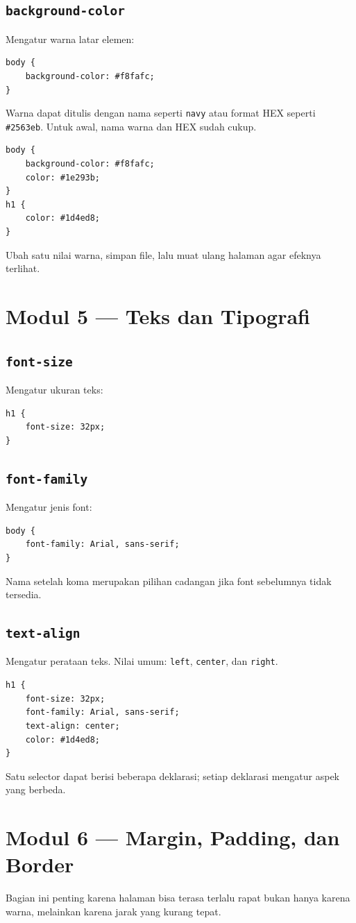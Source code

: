 \documentclass[11pt,a4paper]{article}
\begin{document}
\subsection{\texttt{background-color}}
Mengatur warna latar elemen:
\begin{lstlisting}
body {
    background-color: #f8fafc;
}
\end{lstlisting}
Warna dapat ditulis dengan nama seperti \texttt{navy} atau format HEX seperti \texttt{\#2563eb}. Untuk awal, nama warna dan HEX sudah cukup.
\begin{lstlisting}
body {
    background-color: #f8fafc;
    color: #1e293b;
}
h1 {
    color: #1d4ed8;
}
\end{lstlisting}
Ubah satu nilai warna, simpan file, lalu muat ulang halaman agar efeknya terlihat.

\section{Modul 5 --- Teks dan Tipografi}
\subsection{\texttt{font-size}}
Mengatur ukuran teks:
\begin{lstlisting}
h1 {
    font-size: 32px;
}
\end{lstlisting}
\subsection{\texttt{font-family}}
Mengatur jenis font:
\begin{lstlisting}
body {
    font-family: Arial, sans-serif;
}
\end{lstlisting}
Nama setelah koma merupakan pilihan cadangan jika font sebelumnya tidak tersedia.
\subsection{\texttt{text-align}}
Mengatur perataan teks. Nilai umum: \texttt{left}, \texttt{center}, dan \texttt{right}.
\begin{lstlisting}
h1 {
    font-size: 32px;
    font-family: Arial, sans-serif;
    text-align: center;
    color: #1d4ed8;
}
\end{lstlisting}
Satu selector dapat berisi beberapa deklarasi; setiap deklarasi mengatur aspek yang berbeda.

\section{Modul 6 --- Margin, Padding, dan Border}
Bagian ini penting karena halaman bisa terasa terlalu rapat bukan hanya karena warna, melainkan karena jarak yang kurang tepat.
\end{document}
